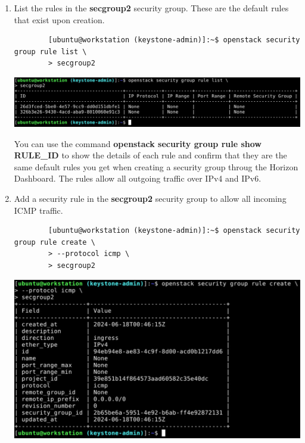 \documentclass[letterpaper, 12pt]{article}
\begin{document}
\begin{enumerate}
    \item List the rules in the \textbf{secgroup2} security group. These are the default rules that exist upon
    creation.
    \begin{lstlisting}
        [ubuntu@workstation (keystone-admin)]:~$ openstack security group rule list \
        > secgroup2
    \end{lstlisting}

    \begin{center}
        \includegraphics[width=\linewidth]{images/part5/step13.png}
    \end{center}

    \begin{tipbox}
        You can use the command \textbf{openstack security group rule show RULE\_ID} to show the details of each rule
        and confirm that they are the same default rules you get when creating a security group throug the Horizon
        Dashboard. The rules allow all outgoing traffic over IPv4 and IPv6.
    \end{tipbox}

    \item Add a security rule in the \textbf{secgroup2} security group to allow all incoming ICMP traffic. 
    \begin{lstlisting}
        [ubuntu@workstation (keystone-admin)]:~$ openstack security group rule create \
        > --protocol icmp \
        > secgroup2
    \end{lstlisting}

    \begin{center}
        \includegraphics[width=\linewidth]{images/part5/step14.png}
    \end{center}


\end{enumerate}
\end{document}

